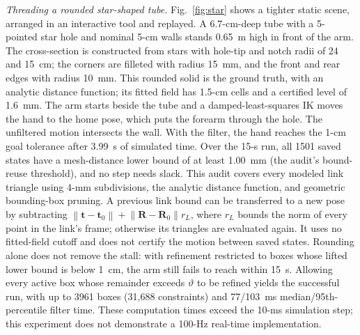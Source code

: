 \documentclass[journal]{IEEEtran}
\theoremstyle{definition}
\newcommand{\norm}[1]{\left\lVert #1\right\rVert}
\newcommand{\Rot}{\mathbf{R}}
\begin{document}
\emph{Threading a rounded star-shaped tube.} Fig.~\ref{fig:star} shows a tighter static scene,
arranged in an interactive tool and replayed. A 6.7-cm-deep tube with a 5-pointed star hole and
nominal 5-cm walls stands 0.65~m high in front of the arm. The cross-section is constructed from
stars with hole-tip and notch radii of 24 and 15~cm; the corners are filleted with radius 15~mm,
and the front and rear edges with radius 10~mm. This rounded solid is the ground truth, with an
analytic distance function; its fitted field has 1.5-cm cells and a certified level of 1.6~mm.
The arm starts beside the tube and a damped-least-squares IK moves the hand to the home pose,
which puts the forearm through the hole. The unfiltered motion intersects the wall.
With the filter, the hand reaches the 1-cm goal tolerance after 3.99~s of simulated time.
Over the 15-s run, all 1501 saved states have a mesh-distance lower bound of at least 1.00~mm
(the audit's bound-reuse threshold),
and no step needs slack. This audit covers every modeled link triangle using 4-mm subdivisions,
the analytic distance function, and geometric bounding-box pruning. A previous link bound can
be transferred to a new pose by subtracting
$\norm{\mathbf t-\mathbf t_0}+\norm{\Rot-\Rot_0}r_L$, where $r_L$ bounds the norm of every
point in the link's frame; otherwise its triangles are evaluated again. It uses no fitted-field
cutoff and does not certify the motion between saved states.
Rounding alone does not remove the stall: with refinement restricted
to boxes whose lifted lower bound is below 1~cm, the arm still fails to reach within 15~s.
Allowing every active box whose remainder exceeds $\vartheta$ to be refined yields the successful
run, with up to 3961 boxes (31{,}688 constraints) and 77/103~ms median/95th-percentile filter time.
These computation times exceed the 10-ms simulation step; this experiment does not demonstrate
a 100-Hz real-time implementation.
\end{document}
